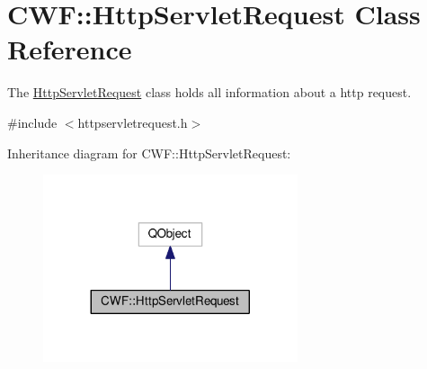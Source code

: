 \hypertarget{class_c_w_f_1_1_http_servlet_request}{\section{C\+W\+F\+:\+:Http\+Servlet\+Request Class Reference}
\label{class_c_w_f_1_1_http_servlet_request}
}


The \hyperlink{class_c_w_f_1_1_http_servlet_request}{Http\+Servlet\+Request} class holds all information about a http request.  




{\ttfamily \#include $<$httpservletrequest.\+h$>$}



Inheritance diagram for C\+W\+F\+:\+:Http\+Servlet\+Request\+:\nopagebreak
\begin{figure}[H]
\begin{center}
\leavevmode
\includegraphics[width=212pt]{class_c_w_f_1_1_http_servlet_request__inherit__graph}
\end{center}
\end{figure}
